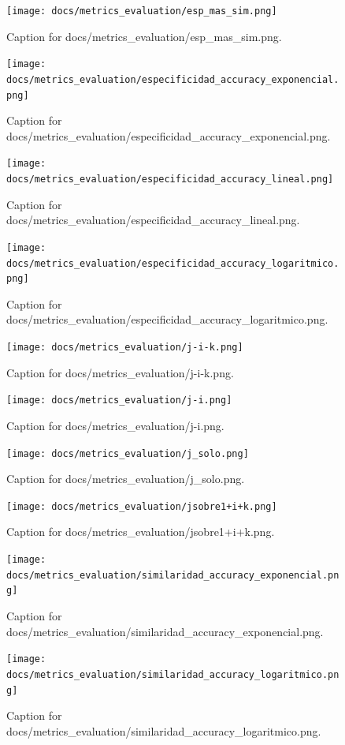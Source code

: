 \documentclass{article}
\begin{document}
\begin{figure}[h] \centering \texttt{[image: docs/metrics\_evaluation/esp\_mas\_sim.png]} \caption{Caption for docs/metrics_evaluation/esp_mas_sim.png.} \end{figure}
\begin{figure}[h] \centering \texttt{[image: docs/metrics\_evaluation/especificidad\_accuracy\_exponencial.png]} \caption{Caption for docs/metrics_evaluation/especificidad_accuracy_exponencial.png.} \end{figure}
\begin{figure}[h] \centering \texttt{[image: docs/metrics\_evaluation/especificidad\_accuracy\_lineal.png]} \caption{Caption for docs/metrics_evaluation/especificidad_accuracy_lineal.png.} \end{figure}
\begin{figure}[h] \centering \texttt{[image: docs/metrics\_evaluation/especificidad\_accuracy\_logaritmico.png]} \caption{Caption for docs/metrics_evaluation/especificidad_accuracy_logaritmico.png.} \end{figure}
\begin{figure}[h] \centering \texttt{[image: docs/metrics\_evaluation/j-i-k.png]} \caption{Caption for docs/metrics_evaluation/j-i-k.png.} \end{figure}
\begin{figure}[h] \centering \texttt{[image: docs/metrics\_evaluation/j-i.png]} \caption{Caption for docs/metrics_evaluation/j-i.png.} \end{figure}
\begin{figure}[h] \centering \texttt{[image: docs/metrics\_evaluation/j\_solo.png]} \caption{Caption for docs/metrics_evaluation/j_solo.png.} \end{figure}
\begin{figure}[h] \centering \texttt{[image: docs/metrics\_evaluation/jsobre1+i+k.png]} \caption{Caption for docs/metrics_evaluation/jsobre1+i+k.png.} \end{figure}
\begin{figure}[h] \centering \texttt{[image: docs/metrics\_evaluation/similaridad\_accuracy\_exponencial.png]} \caption{Caption for docs/metrics_evaluation/similaridad_accuracy_exponencial.png.} \end{figure}
\begin{figure}[h] \centering \texttt{[image: docs/metrics\_evaluation/similaridad\_accuracy\_logaritmico.png]} \caption{Caption for docs/metrics_evaluation/similaridad_accuracy_logaritmico.png.} \end{figure}
\end{document}
